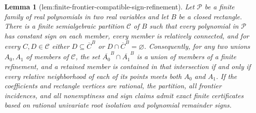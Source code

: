 \documentclass{article}
\newtheorem{lemma}{Lemma}
\begin{document}
\begin{lemma}[lem:finite-frontier-compatible-sign-refinement]\label{lem:finite-frontier-compatible-sign-refinement}
Let \(\mathscr P\) be a finite family of real polynomials in two real variables and let \(B\) be a closed rectangle. There is a finite semialgebraic partition \(\mathscr C\) of \(B\) such that every polynomial in \(\mathscr P\) has constant sign on each member, every member is relatively connected, and for every \(C,D\in\mathscr C\) either \(D\subseteq\overline C^{B}\) or \(D\cap\overline C^{B}=\varnothing\). Consequently, for any two unions \(A_0,A_1\) of members of \(\mathscr C\), the set \(\overline{A_0}^{B}\cap\overline{A_1}^{B}\) is a union of members of a finite refinement, and a retained member is contained in that intersection if and only if every relative neighborhood of each of its points meets both \(A_0\) and \(A_1\). If the coefficients and rectangle vertices are rational, the partition, all frontier incidences, and all nonemptiness and sign claims admit exact finite certificates based on rational univariate root isolation and polynomial remainder signs.
\end{lemma}
\end{document}
